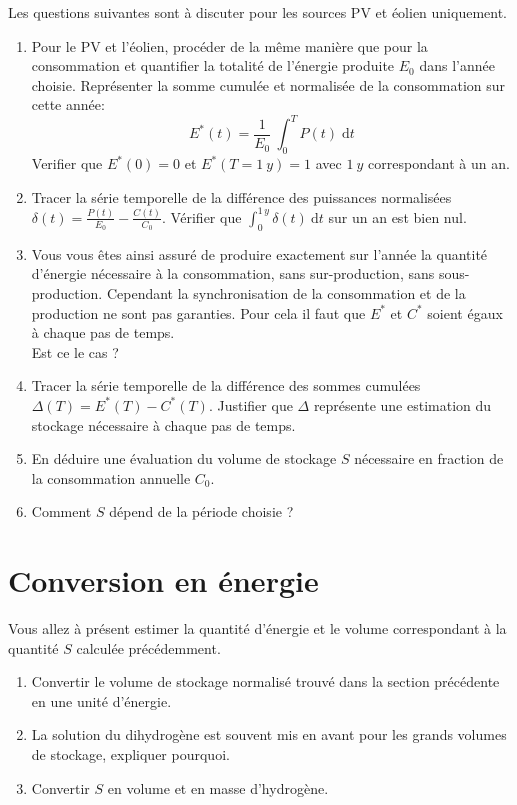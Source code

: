 \documentclass[12pt,a4,french]{article}
\begin{document}
Les questions suivantes sont à discuter pour les sources PV et éolien uniquement.
\begin{enumerate}
	\item Pour le PV et l'éolien, procéder de la même manière que pour la consommation et quantifier la totalité de l'énergie produite  $E_0$ dans l'année choisie. Représenter la somme cumulée et normalisée de la consommation sur cette année: 
	\begin{equation}
		E^*(t)  = \frac{1}{E_0} ~ \int_{0}^{T} P(t) \; \text{d} t	
	\end{equation}
	Verifier que $E^*(0)=0$ et $E^*(T=1~y)=1$ avec $1~y$ correspondant à un an. 
	
	\item Tracer la série temporelle de la différence des puissances normalisées $\delta(t) = \frac{P(t)}{E_0} - \frac{C(t)}{C_0}$. Vérifier que $\int_0^{1\,y} \delta(t) ~ \text{d} t $ sur un an est bien nul.
	
	\item Vous vous êtes ainsi assuré de produire exactement sur l'année la quantité d'énergie nécessaire à la consommation, sans sur-production, sans sous-production. Cependant la synchronisation de la consommation et de la production ne sont pas garanties. Pour cela il faut que $E^*$ et $C^*$ soient égaux à chaque pas de temps.\\ Est ce le cas ? 
	
	\item Tracer la série temporelle de la différence des sommes cumulées $\Delta(T) = E^*(T) - C^*(T)$. Justifier que $\Delta $ représente une estimation du stockage nécessaire à chaque pas de temps.
	
	\item En déduire une évaluation du volume de stockage $S$ nécessaire en fraction de la consommation annuelle $C_0$.
	
	\item Comment $S$ dépend de la période choisie ?
	
\end{enumerate}

\section{Conversion en énergie}

Vous allez à présent estimer la quantité d'énergie et le volume correspondant à la quantité $S$ calculée précédemment. 

\begin{enumerate}
	\item Convertir le volume de stockage normalisé trouvé dans la section précédente en une unité d'énergie.
	\item La solution du dihydrogène est souvent mis en avant pour les grands volumes de stockage, expliquer pourquoi.
	\item Convertir $S$ en volume et en masse d'hydrogène.
\end{enumerate}
\end{document}
